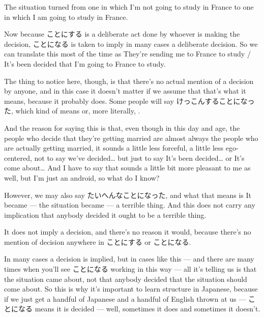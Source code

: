 The situation turned from one in which I'm not going to study in France to one in which I am going to study in France.

{}

Now because ことにする is a deliberate act done by whoever is making the decision, ことになる is taken to imply in many cases a deliberate decision. So we can translate this most of the time as They're sending me to France to study / It's been decided that I'm going to France to study.

The thing to notice here, though, is that there's no actual mention of a decision by anyone, and in this case it doesn't matter if we assume that that's what it means, because it probably does. Some people will say けっこんすることになった, which kind of means  or, more literally, .

{}

And the reason for saying this is that, even though in this day and age, the people who decide that they're getting married are almost always the people who are actually getting married, it sounds a little less forceful, a little less ego-centered, not to say we've decided\ldots{} but just to say It's been decided\ldots{} or It's come about\ldots{} And I have to say that sounds a little bit more pleasant to me as well, but I'm just an android, so what do I know?

However, we may also say たいへんなことになった, and what that means is It became --- the situation became --- a terrible thing. And this does not carry any implication that anybody decided it ought to be a terrible thing.

It does not imply a decision, and there's no reason it would, because there's no mention of decision anywhere in ことにする or ことになる.

{}

In many cases a decision is implied, but in cases like this --- and there are many times when you'll see ことになる working in this way --- all it's telling us is that the situation came about, not that anybody decided that the situation should come about. So this is why it's important to learn structure in Japanese, because if we just get a handful of Japanese and a handful of English thrown at us --- ことになる means it is decided --- well, sometimes it does and sometimes it doesn't.

